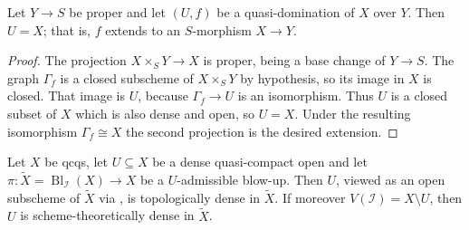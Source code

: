 \begin{lemma}
  \label{lemma:nagata-conrad-quasi-domination-proper-target}
  \leanok

  Let $Y\to S$ be proper and let $(U,f)$ be a quasi-domination of $X$ over
  $Y$.  Then $U=X$; that is, $f$ extends to an $S$-morphism $X\to Y$.
\end{lemma}

\begin{proof}
  \leanok
  The projection $X\times_SY\to X$ is proper, being a base change of
  $Y\to S$.  The graph $\Gamma_f$ is a closed subscheme of $X\times_SY$ by
  hypothesis, so its image in $X$ is closed.  That image is $U$, because
  $\Gamma_f\to U$ is an isomorphism.  Thus $U$ is a closed subset of $X$
  which is also dense and open, so $U=X$.  Under the resulting isomorphism
  $\Gamma_f\cong X$ the second projection is the desired extension.
\end{proof}

\begin{lemma}
  \label{lemma:nagata-conrad-dense-in-admissible-blowup}
  \leanok

  Let $X$ be qcqs, let $U\subseteq X$ be a dense quasi-compact open and let
  $\pi\colon\widetilde X=\operatorname{Bl}_{\mathcal I}(X)\to X$ be a
  $U$-admissible blow-up.  Then $U$, viewed as an open subscheme of
  $\widetilde X$ via , is
  topologically dense in $\widetilde X$.  If moreover
  $V(\mathcal I)=X\setminus U$, then $U$ is scheme-theoretically dense in
  $\widetilde X$.
\end{lemma}

